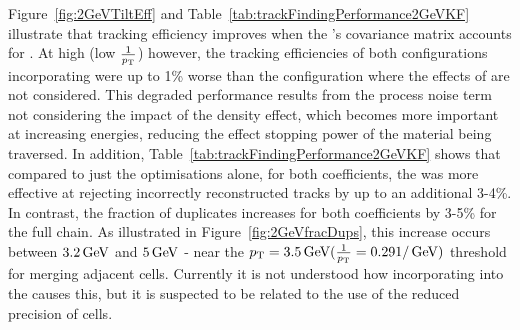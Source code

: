 Figure~\ref{fig:2GeVTiltEff} and Table~\ref{tab:trackFindingPerformance2GeVKF} illustrate that tracking efficiency improves when the \KF's covariance matrix accounts for \MS.
At high \pT (low $\frac{1}{p_{\mathrm{T}}}$) however, the tracking efficiencies of both \KF configurations incorporating \MS were up to 1\% worse than the configuration where the effects of \MS are not considered.
This degraded performance results from the process noise term not considering the impact of the density effect, which becomes more important at increasing energies, reducing the effect stopping power of the material being traversed.
In addition, Table~\ref{tab:trackFindingPerformance2GeVKF} shows that compared to just the \HT optimisations alone, for both \MS coefficients, the \KF was more effective at rejecting incorrectly reconstructed tracks by up to an additional 3-4\%.
In contrast, the fraction of duplicates increases for both coefficients by 3-5\% for the full chain.
As illustrated in Figure~\ref{fig:2GeVfracDups}, this increase occurs between $3.2\,\text{Ge\hspace{-.08em}V}$ and $5\,\text{Ge\hspace{-.08em}V}$ - near the $p_{\mathrm{T}} = 3.5\,\text{Ge\hspace{-.08em}V} (\frac{1}{p_{\mathrm{T}}} = 0.29 1/\,\text{Ge\hspace{-.08em}V})$ threshold for merging adjacent \HT cells.
Currently it is not understood how incorporating \MS into the \KF causes this, but it is suspected to be related to the use of the reduced precision of \HT cells.


